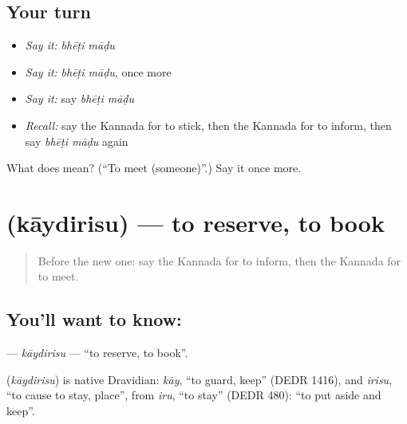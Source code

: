 \subsection*{Your turn}
\begin{itemize}
\raggedright
  \item \emph{Say it:} \emph{bhēṭi māḍu}
  \item \emph{Say it:} \emph{bhēṭi māḍu}, once more
  \item \emph{Say it:} say \emph{bhēṭi māḍu}
  \item \emph{Recall:} say the Kannada for to stick, then the Kannada for to inform, then say \emph{bhēṭi māḍu} again
\end{itemize}

\begin{tcolorbox}[breakable,colback=teal!4,colframe=teal!35!black,title={Before you move on}]
What does   mean? (\textquotedblleft{}To meet (someone)\textquotedblright{}.) Say it once more.
\end{tcolorbox}
\section[\texorpdfstring{\kn{ಕಾಯ್ದಿರಿಸು} (kāydirisu)}{ಕಾಯ್ದಿರಿಸು (kāydirisu)}]{ (kāydirisu) — to reserve, to book}

\label{lesson:KA-C161-kaydirisu}



\begin{quote}
Before the new one: say the Kannada for to inform, then the Kannada for to meet.
\end{quote}

\subsection*{You'll want to know: }
\textbf{} — \emph{kāydirisu} — \textquotedblleft{}to reserve, to book\textquotedblright{}.

\begin{cousinweb}
\textbf{} (\emph{kāydirisu}) is native Dravidian: \emph{kāy}, \textquotedblleft{}to guard, keep\textquotedblright{} (DEDR 1416), and \emph{irisu}, \textquotedblleft{}to cause to stay, place\textquotedblright{}, from \emph{iru}, \textquotedblleft{}to stay\textquotedblright{} (DEDR 480): \textquotedblleft{}to put aside and keep\textquotedblright{}.
\end{cousinweb}

